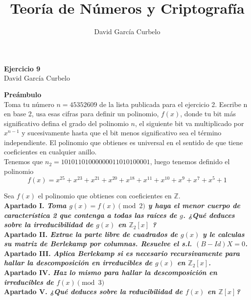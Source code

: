 \documentclass[fleqn]{article}
\author{David García Curbelo}
\title{Teoría de Números y Criptografía}
\def\Z{\mathds{Z}}
\begin{document}
    \begin{center}
        \LARGE{\textbf{Ejercicio 9}} \\
        \Large{David García Curbelo} \\
    \end{center}

    \vspace{1cm}

    \textbf{Preámbulo} \\
    Toma tu número $n=45352609$ de la lista publicada para el ejercicio 2.
    Escribe n en base 2, usa esas cifras para definir un polinomio, $f(x)$, donde tu bit más significativo
    defina el grado del polinomio $n$, el siguiente bit va multiplicado por $x^{n-1}$ y sucesivamente hasta 
    que el bit menos significativo sea el término independiente. El polinomio que obtienes es universal en el
    sentido de que tiene coeficientes en cualquier anillo.\\

    Tenemos que $n_2 = 10101101000000011010100001$, luego tenemos definido el polinomio 
    $$f(x) = x^{25} + x^{23} + x^{21} + x^{20} + x^{18} + x^{11} + x^{10} + x^{9} + x^{7} + x^{5} + 1$$

    \newpage
    Sea $f(x)$ el polinomio que obtienes con coeficientes en $\Z$.\\ 

    \textbf{Apartado I. \textit{Toma $g(x) = f(x) \pmod{2}$ y haya el menor cuerpo de característica 2 que contenga
                                a todas las raíces de $g$. ¿Qué deduces sobre la irreducibilidad de $g(x)$ en $\Z_2[x]$ ?}}\\
    

    \newpage
    \textbf{Apartado II. \textit{Extrae la parte libre de cuadrados de $g(x)$ y le calculas su matriz de Berlekamp por
                                columnas. Resuelve el s.l. $(B - Id)X = 0$.}}\\

    \newpage
    \textbf{Apartado III. \textit{Aplica Berlekamp si es necesario recursivamente para hallar la descomposición en irreducibles de $g(x)$ en $\Z_2[x]$.}} \\


    \newpage
    \textbf{Apartado IV. \textit{Haz lo mismo para hallar la descomposición en irreducibles de $f(x) \pmod{3}$}}\\
    \newpage
    \textbf{Apartado V. \textit{¿Qué deduces sobre la reducibilidad de $f(x)$ en $\Z[x]$?}}\\
\end{document}
